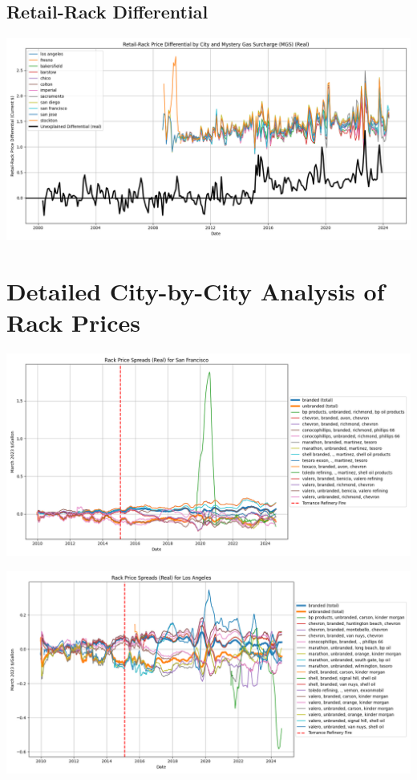 \documentclass{article}
\begin{document}
\subsection{Retail-Rack Differential}
\includegraphics[width=7in]{retail_rack_differentials.png}

\section{Detailed City-by-City Analysis of Rack Prices}
\includegraphics[width=7in]{san francisco_spread.png}

\includegraphics[width=7in]{los angeles_spread.png}
\end{document}
